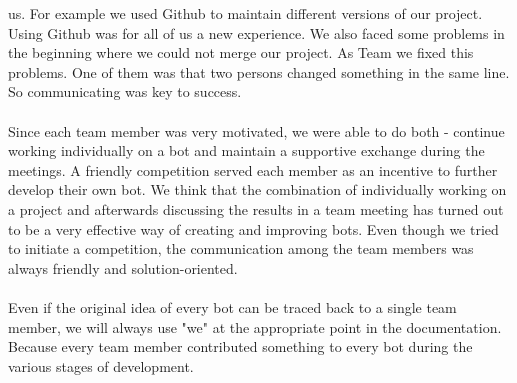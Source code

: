 \documentclass[a4paper,12pt]{article}
\begin{document}
us. For example we used Github to maintain different versions of our project. Using Github was for all of us a new experience. We also faced some problems in the beginning where we could not merge our project. As Team we fixed this problems. One of them was that two persons changed something in the same line. So communicating was key to success.\\
\\Since each team member was very motivated, we were able to do both - continue working
individually on a bot and maintain a supportive exchange during the meetings. A friendly
competition served each member as an incentive to further develop their own bot. We think that the
combination of individually working on a project and afterwards discussing the results in a team
meeting has turned out to be a very effective way of creating and improving bots. Even though we
tried to initiate a competition, the communication among the team members was always friendly
and solution-oriented.\\
\\Even if the original idea of every bot can be traced back to a single team member, we will always
use "we" at the appropriate point in the documentation. Because every team member contributed
something to every bot during the various stages of development.
\newpage	
\end{document}

